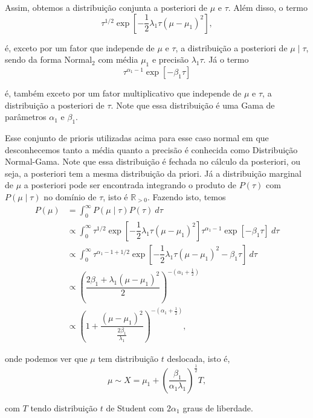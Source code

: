 \documentclass{article}
\begin{document}
Assim, obtemos a distribuição conjunta a posteriori de $\mu$ e $\tau$. Além disso, o termo
\[\tau^{1/2} \exp{\left[-\dfrac{1}{2}\lambda_1\tau\left(\mu - \mu_1\right)^2\right]},\]

\noindent é, exceto por um fator que independe de $\mu$ e $\tau$, a distribuição a posteriori de $\mu \mid \tau$, sendo da forma Normal$_2$ com média $\mu_1$ e precisão $\lambda_1\tau$. Já o termo
\[\tau^{\alpha_1 - 1} \exp{\left[-\beta_1\tau\right]}\]

\noindent é, também exceto por um fator multiplicativo que independe de $\mu$ e $\tau$, a distribuição a posteriori de $\tau$. Note que essa distribuição é uma Gama de parâmetros $\alpha_1$ e $\beta_1$.

Esse conjunto de prioris utilizadas acima para esse caso normal em que desconhecemos tanto a média quanto a precisão é conhecida como Distribuição Normal-Gama. Note que essa distribuição é fechada no cálculo da posteriori, ou seja, a posteriori tem a mesma distribuição da priori. Já a distribuição marginal de $\mu$ a posteriori pode ser encontrada integrando o produto de $P(\tau)$ com $P(\mu \mid \tau)$ no domínio de $\tau$, isto é $\mathbb{R}_{>0}$. Fazendo isto, temos
\begin{equation*}
    \begin{split}
        P(\mu) & = \int_{0}^{\infty} P(\mu \mid \tau) P(\tau) ~d\tau \\
        & \propto \int_{0}^{\infty} \tau^{1/2} \exp{\left[-\dfrac{1}{2}\lambda_1\tau\left(\mu - \mu_1\right)^2\right]} \tau^{\alpha_1 - 1} \exp{\left[-\beta_1\tau\right]} ~d\tau \\
        & \propto \int_{0}^{\infty} \tau^{\alpha_1 - 1 + 1/2} \exp{\left[-\dfrac{1}{2}\lambda_1\tau\left(\mu - \mu_1\right)^2 - \beta_1\tau\right]} ~d\tau \\
        & \propto \left(\dfrac{2\beta_1 + \lambda_1 \left(\mu - \mu_1\right)^2}{2}\right)^{-\left(\alpha_1 + \frac{1}{2}\right)} \\
        & \propto \left(1 + \dfrac{\left(\mu - \mu_1\right)^2}{\frac{2\beta_1}{\lambda_1}}\right)^{-\left(\alpha_1 + \frac{1}{2}\right)},
    \end{split}
\end{equation*}

\noindent onde podemos ver que $\mu$ tem distribuição $t$ deslocada, isto é,
\[\mu \sim X = \mu_1 + \left(\dfrac{\beta_1}{\alpha_1 \lambda_1}\right)^{\frac{1}{2}}T,\]

\noindent com $T$ tendo distribuição $t$ de Student com $2\alpha_1$ graus de liberdade.
\end{document}
